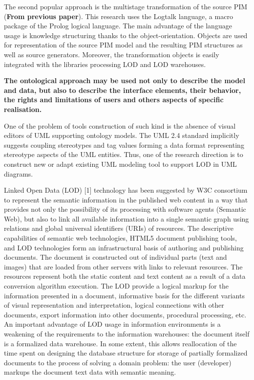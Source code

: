 \documentclass[conference,a4paper]{IEEEtran}
\begin{document}
The second popular approach is the multistage transformation of the source PIM (\textbf{From previous paper}).  This research uses the Logtalk language, a macro package of the Prolog logical language.  The main advantage of the language usage is knowledge structuring thanks to the object-orientation.  Objects are used for representation of the source PIM model and the resulting PIM structures as well as source generators.  Moreover, the transformation objects is easily integrated with the libraries processing LOD and LOD warehouses.

\textbf{The ontological approach may be used not only to describe the model and data, but also to describe the interface elements, their behavior, the rights and limitations of users and others aspects of specific realisation.}

One of the problem of tools construction of such kind is the absence of visual editors of UML supporting ontology models.  The UML 2.4 standard implicitly suggests coupling stereotypes and tag values forming a data format representing stereotype aspects of the UML entities.  Thus, one of the research direction is to construct new or adapt existing UML modeling tool to support LOD in UML diagrams.

Linked Open Data (LOD) [1] technology has been suggested by W3C consortium to represent the semantic information in the published web content in a way that provides not only the possibility of its processing with software agents (Semantic Web), but also to link all available information into a single semantic graph using relations and global universal identifiers (URIs) of resources. The descriptive capabilities of semantic web technologies, HTML5 document publishing tools, and LOD technologies form an infrastructural basis of authoring and publishing documents. The document is constructed out of individual parts (text and images) that are loaded from other servers with links to relevant resources. The resources represent both the static content and text content as a result of a data conversion algorithm execution. The LOD provide a logical markup for the information presented in a document, informative basis for the different variants of visual representation and interpretation, logical connections with other documents, export information into other documents, procedural processing, etc. An important advantage of LOD usage in information environments is a weakening of the requirements to the information warehouses: the document itself is a formalized data warehouse. In some extent, this allows reallocation of the time spent on designing the database structure for storage of partially formalized documents to the process of solving a domain problem: the user (developer) markups the document text data with semantic meaning.
\end{document}
